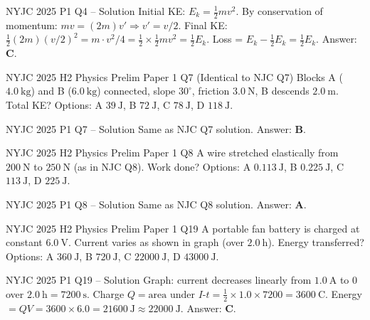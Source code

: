 \documentclass[11pt]{beamer}
\begin{document}
\begin{frame}{NYJC 2025 P1 Q4 – Solution}
Initial KE: $E_k = \frac12 m v^2$.
By conservation of momentum: $mv = (2m)v' \Rightarrow v' = v/2$.
Final KE: $\frac12 (2m) (v/2)^2 = m \cdot v^2/4 = \frac12 \times \frac12 m v^2 = \frac12 E_k$.
Loss = $E_k - \frac12 E_k = \frac12 E_k$.
Answer: \textbf{C}.
\end{frame}

\begin{frame}[shrink=15]{NYJC 2025 H2 Physics Prelim Paper 1 Q7}
(Identical to NJC Q7) Blocks A ($4.0\ \mathrm{kg}$) and B ($6.0\ \mathrm{kg}$) connected, slope $30^\circ$, friction $3.0\ \mathrm{N}$, B descends $2.0\ \mathrm{m}$. Total KE?
Options: A $39\ \mathrm{J}$, B $72\ \mathrm{J}$, C $78\ \mathrm{J}$, D $118\ \mathrm{J}$.
\end{frame}

\begin{frame}{NYJC 2025 P1 Q7 – Solution}
Same as NJC Q7 solution. Answer: \textbf{B}.
\end{frame}

\begin{frame}[shrink=15]{NYJC 2025 H2 Physics Prelim Paper 1 Q8}
A wire stretched elastically from $200\ \mathrm{N}$ to $250\ \mathrm{N}$ (as in NJC Q8). Work done?
Options: A $0.113\ \mathrm{J}$, B $0.225\ \mathrm{J}$, C $113\ \mathrm{J}$, D $225\ \mathrm{J}$.
\end{frame}

\begin{frame}{NYJC 2025 P1 Q8 – Solution}
Same as NJC Q8 solution. Answer: \textbf{A}.
\end{frame}

\begin{frame}[shrink=15]{NYJC 2025 H2 Physics Prelim Paper 1 Q19}
A portable fan battery is charged at constant $6.0\ \mathrm{V}$. Current varies as shown in graph (over $2.0\ \mathrm{h}$). Energy transferred?
Options: A $360\ \mathrm{J}$, B $720\ \mathrm{J}$, C $22000\ \mathrm{J}$, D $43000\ \mathrm{J}$.
\end{frame}

\begin{frame}{NYJC 2025 P1 Q19 – Solution}
Graph: current decreases linearly from $1.0\ \mathrm{A}$ to $0$ over $2.0\ \mathrm{h} = 7200\ \mathrm{s}$.
Charge $Q = \text{area under }I\text{-}t = \frac12 \times 1.0 \times 7200 = 3600\ \mathrm{C}$.
Energy $= QV = 3600 \times 6.0 = 21600\ \mathrm{J} \approx 22000\ \mathrm{J}$.
Answer: \textbf{C}.
\end{frame}
\end{document}
